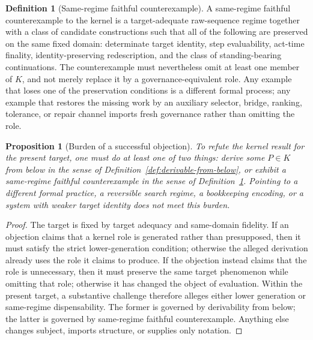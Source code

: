 \documentclass[11pt]{article}
\newtheorem{proposition}[theorem]{Proposition}
\theoremstyle{definition}
\newtheorem{definition}[theorem]{Definition}
\theoremstyle{remark}
\begin{document}
\begin{definition}[Same-regime faithful counterexample]\label{def:same-regime-faithful-counterexample}
A same-regime faithful counterexample to the kernel is a target-adequate raw-sequence regime together with a class of candidate constructions such that all of the following are preserved on the same fixed domain: determinate target identity, step evaluability, act-time finality, identity-preserving redescription, and the class of standing-bearing continuations. The counterexample must nevertheless omit at least one member of $K$, and not merely replace it by a governance-equivalent role. Any example that loses one of the preservation conditions is a different formal process; any example that restores the missing work by an auxiliary selector, bridge, ranking, tolerance, or repair channel imports fresh governance rather than omitting the role.
\end{definition}

\begin{proposition}[Burden of a successful objection]\label{prop:burden-of-objection}
To refute the kernel result for the present target, one must do at least one of two things: derive some $P\in K$ from below in the sense of Definition~\ref{def:derivable-from-below}, or exhibit a same-regime faithful counterexample in the sense of Definition~\ref{def:same-regime-faithful-counterexample}. Pointing to a different formal practice, a reversible search regime, a bookkeeping encoding, or a system with weaker target identity does not meet this burden.
\end{proposition}

\begin{proof}
The target is fixed by target adequacy and same-domain fidelity. If an objection claims that a kernel role is generated rather than presupposed, then it must satisfy the strict lower-generation condition; otherwise the alleged derivation already uses the role it claims to produce. If the objection instead claims that the role is unnecessary, then it must preserve the same target phenomenon while omitting that role; otherwise it has changed the object of evaluation. Within the present target, a substantive challenge therefore alleges either lower generation or same-regime dispensability. The former is governed by derivability from below; the latter is governed by same-regime faithful counterexample. Anything else changes subject, imports structure, or supplies only notation.
\end{proof}
\end{document}
